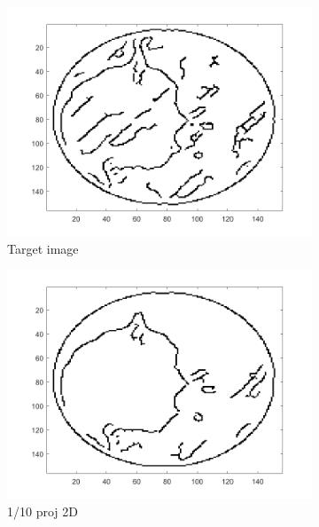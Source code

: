 \begin{figure}[ht!]
      		\begin{subfigure}[b]{0.24\textwidth}
            	\centering
            	\includegraphics[width=\textwidth]{../../data/res/target1_edges.png}
            	\caption{Target image}    
        	\end{subfigure}
        	\begin{subfigure}[b]{0.24\textwidth}  
            	\centering 
            	\includegraphics[width=\textwidth]{../../data/res/SB_Reconstruction/Edges/2D/it250_proj1_10.png}
            	\caption{1/10 proj 2D}    
            	\label{subfig:156p1L-D}
        	\end{subfigure}
        	\begin{subfigure}[b]{0.24\textwidth}  

\end{subfigure}
\end{figure}
